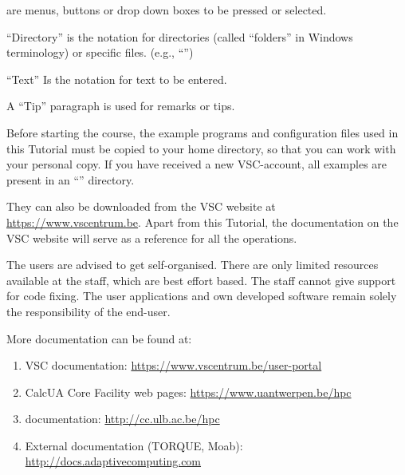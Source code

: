  are menus, buttons or drop down boxes to be pressed or selected.

``Directory'' is the notation for directories (called ``folders'' in
Windows terminology) or specific files. (e.g., ``\homedir'')

``Text'' Is the notation for text to be entered.

\begin{tip}
A ``Tip'' paragraph is used for remarks or tips.
\end{tip}


Before starting the course, the example programs and configuration files used in this Tutorial must be copied to your home directory, so that you can work with your personal copy. If you have received a new VSC-account, all examples are present in an ``\examplesdir'' directory.

\begin{prompt}
\end{prompt}

They can also be downloaded from the VSC website at
\url{https://www.vscentrum.be}.
Apart from this \hpc Tutorial, the documentation on the VSC website
will serve as a reference for all the
operations.


\begin{tip}
The users are advised to get self-organised. There are
only limited resources available at the \hpc staff, which are best effort based.
The \hpc staff cannot give support for code fixing. The user applications and own
developed software remain solely the responsibility of the end-user.
\end{tip}

More documentation can be found at:

\begin{enumerate}
  \item  VSC documentation: \url{https://www.vscentrum.be/user-portal}
  \ifantwerpen
    \item CalcUA Core Facility web pages: \url{https://www.uantwerpen.be/hpc}
  \fi
  \ifbrussel
    \item \hpcname documentation: \url{http://cc.ulb.ac.be/hpc}
  \fi
  \item  External documentation (TORQUE, Moab): \url{http://docs.adaptivecomputing.com}
\end{enumerate}

